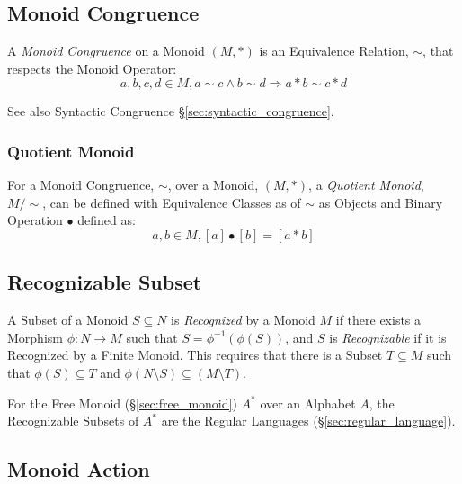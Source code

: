 \subsection{Monoid Congruence}\label{sec:monoid_congruence}

A \emph{Monoid Congruence} on a Monoid $(M,*)$ is an Equivalence
Relation, $\sim$, that respects the Monoid Operator:
\[
  a,b,c,d \in M, a \sim c \wedge b \sim d \Rightarrow a*b \sim c*d
\]

See also Syntactic Congruence \S\ref{sec:syntactic_congruence}.



\subsubsection{Quotient Monoid}\label{sec:quotient_monoid}

For a Monoid Congruence, $\sim$, over a Monoid, $(M,*)$, a
\emph{Quotient Monoid}, $M/\sim$, can be defined with Equivalence
Classes as of $\sim$ as Objects and Binary Operation $\bullet$ defined
as:
\[
  a,b \in M, [a]\bullet[b] = [a*b]
\]



\subsection{Recognizable Subset}\label{sec:recognizable}

A Subset of a Monoid $S \subseteq N$ is \emph{Recognized} by a Monoid
$M$ if there exists a Morphism $\phi : N \rightarrow M$ such that $S =
\phi^{-1}(\phi(S))$, and $S$ is \emph{Recognizable} if it is
Recognized by a Finite Monoid. This requires that there is a Subset $T
\subseteq M$ such that $\phi(S) \subseteq T$ and $\phi(N \setminus S)
\subseteq (M \setminus T)$.

For the Free Monoid (\S\ref{sec:free_monoid}) $A^*$ over an Alphabet
$A$, the Recognizable Subsets of $A^*$ are the Regular Languages
(\S\ref{sec:regular_language}).



\subsection{Monoid Action}\label{sec:monoid_action}

